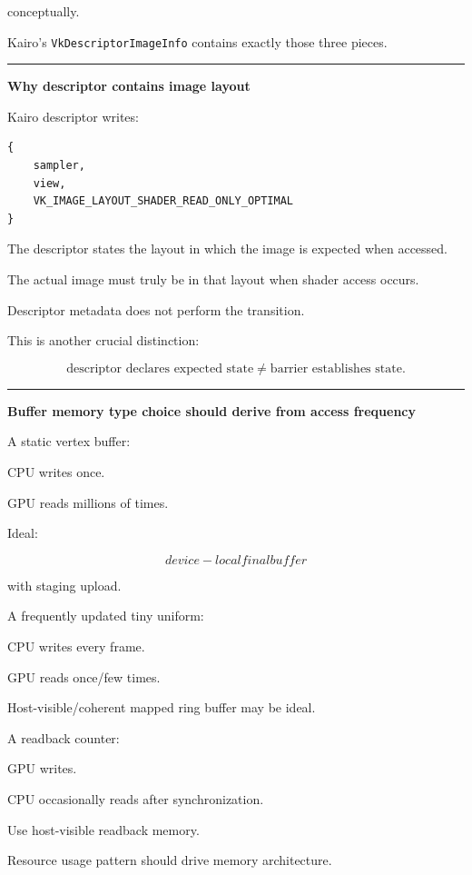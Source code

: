 conceptually.

Kairo's \texttt{VkDescriptorImageInfo} contains exactly those three pieces.

\begin{center}\rule{0.5\linewidth}{0.5pt}\end{center}

\textbf{Why descriptor contains image layout}

Kairo descriptor writes:

\begin{verbatim}
{
    sampler,
    view,
    VK_IMAGE_LAYOUT_SHADER_READ_ONLY_OPTIMAL
}
\end{verbatim}

The descriptor states the layout in which the image is expected when accessed.

The actual image must truly be in that layout when shader access occurs.

Descriptor metadata does not perform the transition.

This is another crucial distinction:

\[
\boxed{
\text{descriptor declares expected state}
\neq
\text{barrier establishes state}.
}
\]

\begin{center}\rule{0.5\linewidth}{0.5pt}\end{center}

\textbf{Buffer memory type choice should derive from access frequency}

A static vertex buffer:

CPU writes once.

GPU reads millions of times.

Ideal:

\[
\boxed{
device-local final buffer
}
\]

with staging upload.

A frequently updated tiny uniform:

CPU writes every frame.

GPU reads once/few times.

Host-visible/coherent mapped ring buffer may be ideal.

A readback counter:

GPU writes.

CPU occasionally reads after synchronization.

Use host-visible readback memory.

Resource usage pattern should drive memory architecture.

